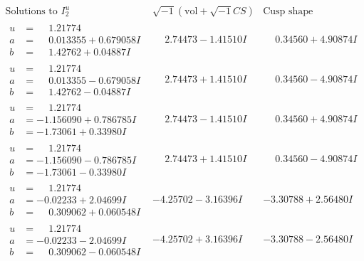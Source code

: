 \documentclass[1p]{elsarticle_modified}
\theoremstyle{definition}
\newcommand{\I}{\sqrt{-1}}
\begin{document}
$$\begin{array}{c|c|c}  
\text{Solutions to }I^u_{2}& \I (\text{vol} + \sqrt{-1}CS) & \text{Cusp shape}\\
 \hline 
\begin{aligned}
u &= \phantom{-}1.21774\phantom{ +0.000000I} \\
a &= \phantom{-}0.013355 + 0.679058 I \\
b &= \phantom{-}1.42762 + 0.04887 I\end{aligned}
 & \phantom{-}2.74473 - 1.41510 I & \phantom{-}0.34560 + 4.90874 I \\ \hline\begin{aligned}
u &= \phantom{-}1.21774\phantom{ +0.000000I} \\
a &= \phantom{-}0.013355 - 0.679058 I \\
b &= \phantom{-}1.42762 - 0.04887 I\end{aligned}
 & \phantom{-}2.74473 + 1.41510 I & \phantom{-}0.34560 - 4.90874 I \\ \hline\begin{aligned}
u &= \phantom{-}1.21774\phantom{ +0.000000I} \\
a &= -1.156090 + 0.786785 I \\
b &= -1.73061 + 0.33980 I\end{aligned}
 & \phantom{-}2.74473 - 1.41510 I & \phantom{-}0.34560 + 4.90874 I \\ \hline\begin{aligned}
u &= \phantom{-}1.21774\phantom{ +0.000000I} \\
a &= -1.156090 - 0.786785 I \\
b &= -1.73061 - 0.33980 I\end{aligned}
 & \phantom{-}2.74473 + 1.41510 I & \phantom{-}0.34560 - 4.90874 I \\ \hline\begin{aligned}
u &= \phantom{-}1.21774\phantom{ +0.000000I} \\
a &= -0.02233 + 2.04699 I \\
b &= \phantom{-}0.309062 + 0.060548 I\end{aligned}
 & -4.25702 - 3.16396 I & -3.30788 + 2.56480 I \\ \hline\begin{aligned}
u &= \phantom{-}1.21774\phantom{ +0.000000I} \\
a &= -0.02233 - 2.04699 I \\
b &= \phantom{-}0.309062 - 0.060548 I\end{aligned}
 & -4.25702 + 3.16396 I & -3.30788 - 2.56480 I \\ \hline\begin{aligned}

\end{aligned}
\end{array}$$
\end{document}
